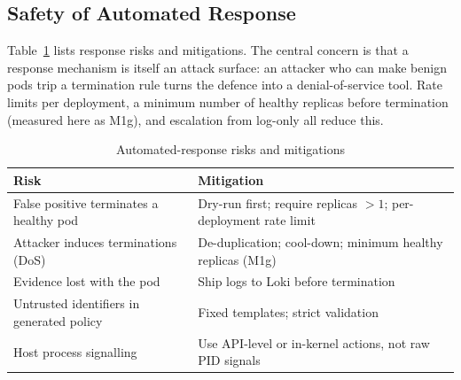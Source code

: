 \documentclass[10pt,conference]{IEEEtran}
\begin{document}
\subsection{Safety of Automated Response}
Table~\ref{tab:risks} lists response risks and mitigations. The central concern is that a response mechanism is itself an attack surface: an attacker who can make benign pods trip a termination rule turns the defence into a denial-of-service tool. Rate limits per deployment, a minimum number of healthy replicas before termination (measured here as M1g), and escalation from log-only all reduce this.

\begin{table}[t]
\caption{Automated-response risks and mitigations}
\label{tab:risks}
\centering
\begin{tabular}{@{}p{}p{}@{}}
\toprule
Risk & Mitigation\\
\midrule
False positive terminates a healthy pod & Dry-run first; require replicas $>1$; per-deployment rate limit\\
Attacker induces terminations (DoS) & De-duplication; cool-down; minimum healthy replicas (M1g)\\
Evidence lost with the pod & Ship logs to Loki before termination\\
Untrusted identifiers in generated policy & Fixed templates; strict validation\\
Host process signalling & Use API-level or in-kernel actions, not raw PID signals\\
\bottomrule
\end{tabular}
\end{table}
\end{document}
